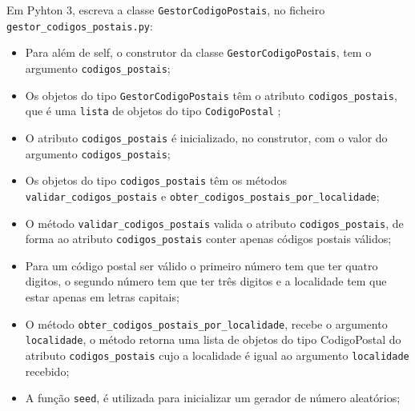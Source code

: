 \documentclass[12pt,varwidth=16cm,border=17pt]{standalone}
\begin{document}
Em Pyhton 3, escreva a classe \verb+GestorCodigoPostais+, no ficheiro \verb+gestor_codigos_postais.py+:

\begin{itemize}

  \item Para além de self, o construtor da classe \verb+GestorCodigoPostais+, tem o argumento \verb+codigos_postais+;
  \item Os objetos do tipo \verb+GestorCodigoPostais+ têm o atributo \verb+codigos_postais+, que é uma \verb+lista+ de objetos do tipo \verb+CodigoPostal+ ;
  
  \item O atributo \verb+codigos_postais+ é inicializado, no construtor, com o valor do argumento \verb+codigos_postais+;
  
  \item Os objetos do tipo \verb+codigos_postais+ têm os métodos \verb+validar_codigos_postais+ e \verb+obter_codigos_postais_por_localidade+;
  
  \item O método \verb+validar_codigos_postais+ valida o atributo \verb+codigos_postais+, de forma ao atributo \verb+codigos_postais+ conter apenas códigos postais válidos;
  \item Para um código postal ser válido o primeiro número tem que ter quatro digitos, o segundo número tem que ter três digitos e a localidade tem que estar apenas em letras capitais;
  
  \item O método \verb+obter_codigos_postais_por_localidade+, recebe o argumento \verb+localidade+, o método retorna uma lista de objetos do tipo CodigoPostal do atributo \verb+codigos_postais+ cujo a localidade é igual ao argumento \verb+localidade+ recebido;


  \item A função \verb+seed+, é utilizada para inicializar um gerador de número aleatórios;
    
\end{itemize}
\end{document}
